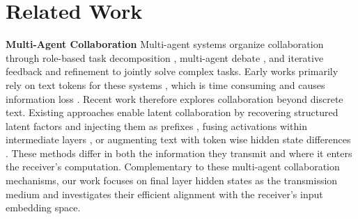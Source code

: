 \documentclass[11pt]{article}
\begin{document}



\section{Related Work}
\textbf{Multi-Agent Collaboration} Multi-agent systems organize collaboration through role-based task decomposition \citep{hong2024metagpt}, multi-agent debate \citep{du2024debate}, and iterative feedback and refinement \citep{liang2024divergent} to jointly solve complex tasks. Early works primarily rely on text tokens for these systems \citep{wu2024autogen,wang2024survey}, which is time consuming and causes information loss \citep{liu2026beyond}. Recent work therefore explores collaboration beyond discrete text. Existing approaches enable latent collaboration by recovering structured latent factors and injecting them as prefixes \citep{zheng2025thought}, fusing activations within intermediate layers \citep{ramesh2025communicating}, or augmenting text with token wise hidden state differences \citep{tang-etal-2025-augmenting}. These methods differ in both the information they transmit and where it enters the receiver's computation. Complementary to these multi-agent collaboration mechanisms, our work focuses on final layer hidden states as the transmission medium and investigates their efficient alignment with the receiver's input embedding space. 
\end{document}
